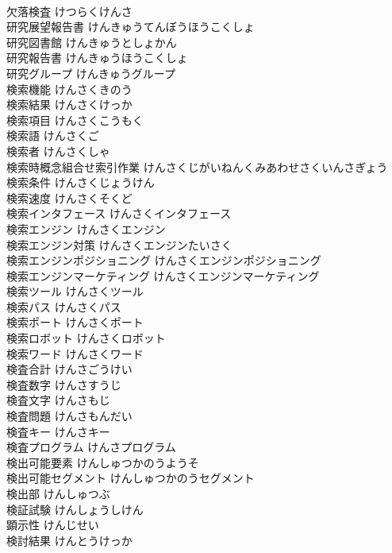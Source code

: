 \documentclass[8pt]{extreport}
\begin{document}
\begin{CJK}{UTF8}{min}
\\	欠落検査	けつらくけんさ	
\\	研究展望報告書	けんきゅうてんぼうほうこくしょ	
\\	研究図書館	けんきゅうとしょかん	
\\	研究報告書	けんきゅうほうこくしょ	
\\	研究グループ	けんきゅうグループ	
\\	検索機能	けんさくきのう	
\\	検索結果	けんさくけっか	
\\	検索項目	けんさくこうもく	
\\	検索語	けんさくご	
\\	検索者	けんさくしゃ	
\\	検索時概念組合せ索引作業	けんさくじがいねんくみあわせさくいんさぎょう	
\\	検索条件	けんさくじょうけん	
\\	検索速度	けんさくそくど	
\\	検索インタフェース	けんさくインタフェース	
\\	検索エンジン	けんさくエンジン	
\\	検索エンジン対策	けんさくエンジンたいさく	
\\	検索エンジンポジショニング	けんさくエンジンポジショニング	
\\	検索エンジンマーケティング	けんさくエンジンマーケティング	
\\	検索ツール	けんさくツール	
\\	検索パス	けんさくパス	
\\	検索ポート	けんさくポート	
\\	検索ロボット	けんさくロボット	
\\	検索ワード	けんさくワード	
\\	検査合計	けんさごうけい	
\\	検査数字	けんさすうじ	
\\	検査文字	けんさもじ	
\\	検査問題	けんさもんだい	
\\	検査キー	けんさキー	
\\	検査プログラム	けんさプログラム	
\\	検出可能要素	けんしゅつかのうようそ	
\\	検出可能セグメント	けんしゅつかのうセグメント	
\\	検出部	けんしゅつぶ	
\\	検証試験	けんしょうしけん	
\\	顕示性	けんじせい	
\\	検討結果	けんとうけっか	

\end{CJK}
\end{document}
